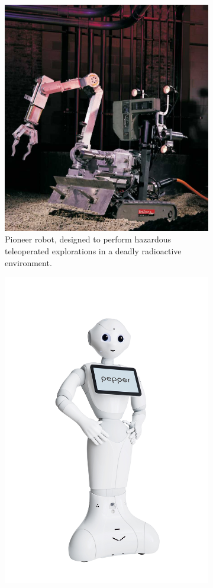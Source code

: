 	\begin{figure}[h]
		\centering
		\begin{subfigure}[b]{0.4\textwidth}
			\centering
			\includegraphics[width=0.8\linewidth]{images/pioneer_chernobyl}
			\caption{Pioneer robot, designed to perform hazardous teleoperated explorations in a deadly radioactive environment.}
			\label{fig:1_pioneer}
		\end{subfigure}
		\hfill
		\begin{subfigure}[b]{0.4\textwidth}
			\centering
			\includegraphics[width=0.8\linewidth]{images/pepper}

\end{subfigure}
\end{figure}
